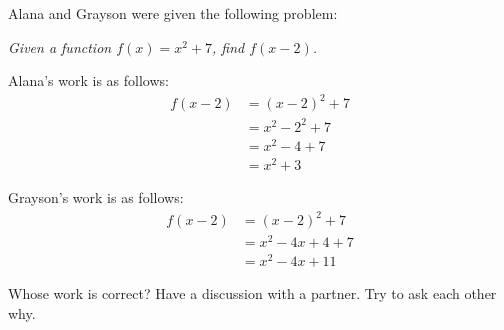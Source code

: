 \documentclass[noauthor,noinstructornotes]{ximera}
\begin{document}
\begin{problem}
Alana and Grayson were given the following problem:

\textit{Given a function \(f(x) = x^2 + 7\), find \(f(x - 2)\).}

Alana's work is as follows:
    \begin{align*}
        f(x - 2) & = (x - 2)^2 + 7 \\
        & = x^2 - 2^2 + 7 \\
        & = x^2 - 4 + 7 \\
        & = x^2 + 3
    \end{align*}

Grayson's work is as follows:
    \begin{align*}
        f(x - 2) & = (x - 2)^2 + 7 \\
        & = x^2 - 4x + 4 + 7 \\
        & = x^2 - 4x + 11
    \end{align*}

Whose work is correct? Have a discussion with a partner. Try to ask
each other why.
\end{problem}
\end{document}
